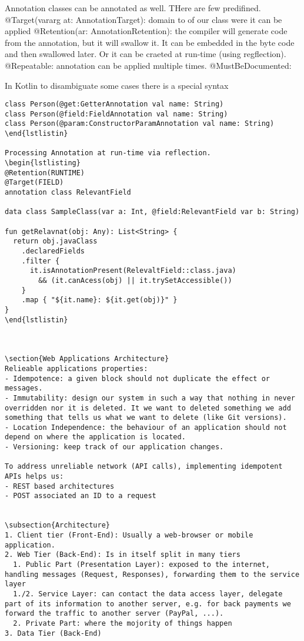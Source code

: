 \documentclass[12pt]{article}
\begin{document}
Annotation classes can be annotated as well. THere are few predifined.
@Target(vararg at: AnnotationTarget): domain to of our class were it can be applied
@Retention(ar: AnnotationRetention): the compiler will generate code from the annotation, but it will swallow it. It can be embedded in the byte code and then swallowed later. Or it can be craeted at run-time (using regflection).
@Repeatable: annotation can be applied multiple times.
@MustBeDocumented: 

In Kotlin to disambiguate some cases there is a special syntax
\begin{lstlisting}
class Person(@get:GetterAnnotation val name: String)
class Person(@field:FieldAnnotation val name: String)
class Person(@param:ConstructorParamAnnotation val name: String)
\end{lstlistin}

Processing Annotation at run-time via reflection.
\begin{lstlisting}
@Retention(RUNTIME)
@Target(FIELD)
annotation class RelevantField

data class SampleClass(var a: Int, @field:RelevantField var b: String)

fun getRelavnat(obj: Any): List<String> {
  return obj.javaClass
    .declaredFields
    .filter {
      it.isAnnotationPresent(RelevaltField::class.java)
        && (it.canAcess(obj) || it.trySetAccessible())
    }
    .map { "${it.name}: ${it.get(obj)}" }
}
\end{lstlistin}



\section{Web Applications Architecture}
Relieable applications properties:
- Idempotence: a given block should not duplicate the effect or messages.
- Immutability: design our system in such a way that nothing in never overridden nor it is deleted. It we want to deleted something we add something that tells us what we want to delete (like Git versions).
- Location Independence: the behaviour of an application should not depend on where the application is located.
- Versioning: keep track of our application changes.

To address unreliable network (API calls), implementing idempotent APIs helps us:
- REST based architectures
- POST associated an ID to a request


\subsection{Architecture}
1. Client tier (Front-End): Usually a web-browser or mobile application.
2. Web Tier (Back-End): Is in itself split in many tiers
  1. Public Part (Presentation Layer): exposed to the internet, handling messages (Request, Responses), forwarding them to the service layer
  1./2. Service Layer: can contact the data access layer, delegate part of its information to another server, e.g. for back payments we forward the traffic to another server (PayPal, ...).
  2. Private Part: where the mojority of things happen
3. Data Tier (Back-End)


\end{lstlisting}
\end{document}
